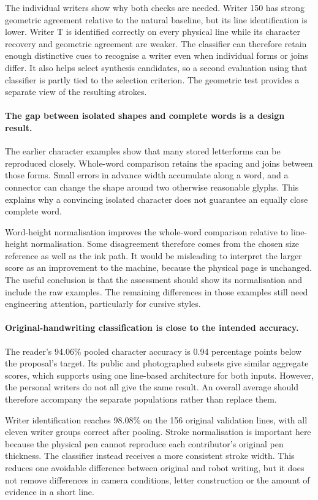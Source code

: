 The individual writers show why both checks are needed. Writer 150 has strong geometric agreement relative to the natural baseline, but its line identification is lower. Writer T is identified correctly on every physical line while its character recovery and geometric agreement are weaker. The classifier can therefore retain enough distinctive cues to recognise a writer even when individual forms or joins differ. It also helps select synthesis candidates, so a second evaluation using that classifier is partly tied to the selection criterion. The geometric test provides a separate view of the resulting strokes.

\paragraph{The gap between isolated shapes and complete words is a design result.}
The earlier character examples show that many stored letterforms can be reproduced closely. Whole-word comparison retains the spacing and joins between those forms. Small errors in advance width accumulate along a word, and a connector can change the shape around two otherwise reasonable glyphs. This explains why a convincing isolated character does not guarantee an equally close complete word.

Word-height normalisation improves the whole-word comparison relative to line-height normalisation. Some disagreement therefore comes from the chosen size reference as well as the ink path. It would be misleading to interpret the larger score as an improvement to the machine, because the physical page is unchanged. The useful conclusion is that the assessment should show its normalisation and include the raw examples. The remaining differences in those examples still need engineering attention, particularly for cursive styles.

\paragraph{Original-handwriting classification is close to the intended accuracy.}
The reader's 94.06\% pooled character accuracy is 0.94 percentage points below the proposal's target. Its public and photographed subsets give similar aggregate scores, which supports using one line-based architecture for both inputs. However, the personal writers do not all give the same result. An overall average should therefore accompany the separate populations rather than replace them.

Writer identification reaches 98.08\% on the 156 original validation lines, with all eleven writer groups correct after pooling. Stroke normalisation is important here because the physical pen cannot reproduce each contributor's original pen thickness. The classifier instead receives a more consistent stroke width. This reduces one avoidable difference between original and robot writing, but it does not remove differences in camera conditions, letter construction or the amount of evidence in a short line.


